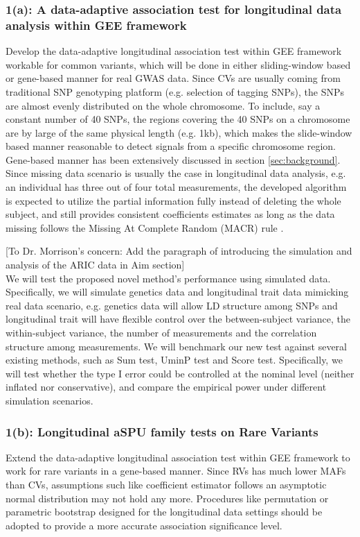 \documentclass[12pt]{article}
\begin{document}
\subsubsection{1(a): A data-adaptive association test for longitudinal data analysis within GEE framework}
Develop the data-adaptive longitudinal association test within GEE framework workable for common variants, which will be done in either sliding-window based or gene-based manner for real GWAS data. Since CVs are usually coming from traditional SNP genotyping platform (e.g. selection of tagging SNPs), the SNPs are almost evenly distributed on the whole chromosome. To include, say a constant number of 40 SNPs, the regions covering the 40 SNPs on a chromosome are by large of the same physical length (e.g. 1kb), which makes the slide-window based manner reasonable to detect signals from a specific chromosome region. Gene-based manner has been extensively discussed in section \ref{sec:background}. Since missing data scenario is usually the case in longitudinal data analysis, e.g. an individual has three out of four total measurements, the developed algorithm is expected to utilize the partial information fully instead of deleting the whole subject, and still provides consistent coefficients estimates as long as the data missing follows the Missing At Complete Random (MACR) rule \cite{rubin1976inference,Xu2014}.

[To Dr. Morrison's concern: Add the paragraph of introducing the simulation and analysis of the ARIC data in Aim section]\\
We will test the proposed novel method's performance using simulated data. Specifically, we will simulate genetics data and longitudinal trait data mimicking real data scenario, e.g. genetics data will allow LD structure among SNPs and longitudinal trait will have flexible control over the between-subject variance, the within-subject variance, the number of measurements and the correlation structure among measurements. We will benchmark our new test against several existing methods, such as Sum test, UminP test and Score test. Specifically, we will test whether the type I error could be controlled at the nominal level (neither inflated nor conservative), and compare the empirical power under different simulation scenarios.
\subsubsection{1(b): Longitudinal aSPU family tests on Rare Variants}
Extend the data-adaptive longitudinal association test within GEE framework to work for rare variants in a gene-based manner. Since RVs has much lower MAFs than CVs, assumptions such like coefficient estimator follows an asymptotic normal distribution may not hold any more. Procedures like permutation or parametric bootstrap designed for the longitudinal data settings should be adopted to provide a more accurate association significance level.
\end{document}
